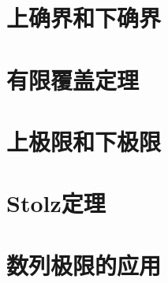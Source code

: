 \documentclass[12pt,a4paper]{article}
\begin{document}
\section{上确界和下确界}



\section{有限覆盖定理}



\section{上极限和下极限}


\section{Stolz定理}




\section{数列极限的应用}
\end{document}
